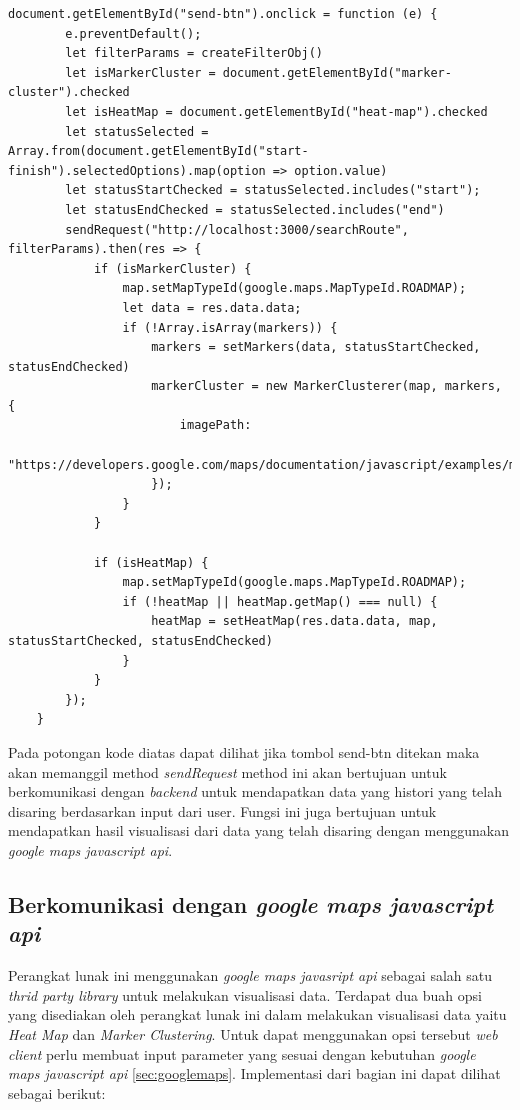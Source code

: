 \begin{lstlisting}[label=communication , caption=communication method]
    document.getElementById("send-btn").onclick = function (e) {
        e.preventDefault();
        let filterParams = createFilterObj()
        let isMarkerCluster = document.getElementById("marker-cluster").checked
        let isHeatMap = document.getElementById("heat-map").checked
        let statusSelected = Array.from(document.getElementById("start-finish").selectedOptions).map(option => option.value)
        let statusStartChecked = statusSelected.includes("start");
        let statusEndChecked = statusSelected.includes("end")
        sendRequest("http://localhost:3000/searchRoute", filterParams).then(res => {
            if (isMarkerCluster) {
                map.setMapTypeId(google.maps.MapTypeId.ROADMAP);
                let data = res.data.data;
                if (!Array.isArray(markers)) {
                    markers = setMarkers(data, statusStartChecked, statusEndChecked)
                    markerCluster = new MarkerClusterer(map, markers, {
                        imagePath:
                            "https://developers.google.com/maps/documentation/javascript/examples/markerclusterer/m",
                    });
                }
            }

            if (isHeatMap) {
                map.setMapTypeId(google.maps.MapTypeId.ROADMAP);
                if (!heatMap || heatMap.getMap() === null) {
                    heatMap = setHeatMap(res.data.data, map, statusStartChecked, statusEndChecked)
                }
            }
        });
    }
\end{lstlisting}

Pada potongan kode diatas dapat dilihat jika tombol send-btn ditekan maka akan memanggil method \textit{sendRequest} method ini akan bertujuan untuk berkomunikasi dengan \textit{backend} untuk mendapatkan data yang histori yang telah disaring berdasarkan input dari user. Fungsi ini juga bertujuan untuk mendapatkan hasil visualisasi dari data yang telah disaring dengan menggunakan \textit{google maps javascript api}.

\subsection{Berkomunikasi dengan \textit{google maps javascript api}}
Perangkat lunak ini menggunakan \textit{google maps javasript api} sebagai salah satu \textit{thrid party library} untuk melakukan visualisasi data. Terdapat dua buah opsi yang disediakan oleh perangkat lunak ini dalam melakukan visualisasi data yaitu \textit{Heat Map} dan \textit{Marker Clustering}. Untuk dapat menggunakan opsi tersebut \textit{web client} perlu membuat input parameter yang sesuai dengan kebutuhan \textit{google maps javascript api} \ref{sec:googlemaps}. Implementasi dari bagian ini dapat dilihat sebagai berikut:

